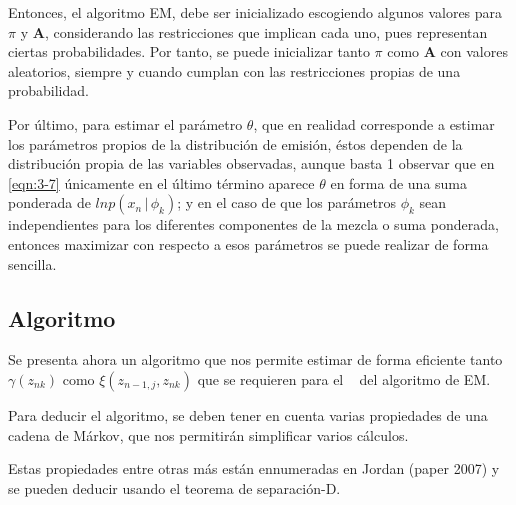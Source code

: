 Entonces, el algoritmo \ac{EM}, debe ser inicializado escogiendo algunos valores para $\pi$ y $\mathbf{A}$, considerando las restricciones que implican cada uno, pues representan ciertas probabilidades. Por tanto, se puede inicializar tanto $\pi$ como $\mathbf{A}$ con valores aleatorios, siempre y cuando cumplan con las restricciones propias de una probabilidad. 

Por último, para estimar el parámetro $\theta$, que en realidad corresponde a estimar los parámetros propios de la distribución de emisión, éstos dependen de la distribución propia de las variables observadas, aunque basta 1 observar que en \eqref{eqn:3-7} únicamente en el último término aparece $\theta$ en forma de una suma ponderada de $ln p(x_n \,|\,  \phi_k)$; y en el caso de que los parámetros $\phi_k$ sean independientes para los diferentes componentes de la mezcla o suma ponderada, entonces maximizar con respecto a esos parámetros se puede realizar de forma sencilla.

\subsection{Algoritmo \abf}

Se presenta ahora un algoritmo que nos permite estimar de forma eficiente tanto $\gamma(z_{nk})$ como $\xi(z_{n-1, j}, z_{nk})$ que se requieren para el \estep~ del algoritmo de \ac{EM}.

Para deducir el algoritmo, se deben tener en cuenta varias propiedades de una cadena de Márkov, que nos permitirán simplificar varios cálculos. 

Estas propiedades entre otras más están ennumeradas en Jordan (paper 2007) y  se pueden deducir usando el teorema de separación-D.

